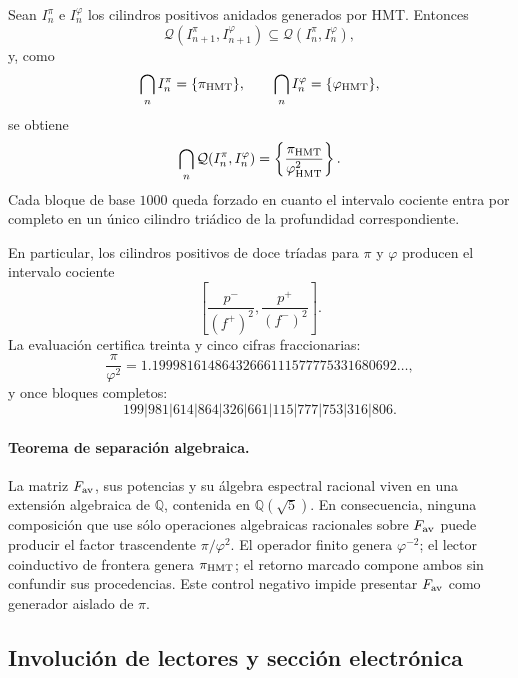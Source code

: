 Sean \(I_n^\pi\) e \(I_n^\varphi\) los cilindros positivos anidados
generados por HMT\@. Entonces
\[
 \mathcal Q(I_{n+1}^\pi,I_{n+1}^\varphi)
 \subseteq
 \mathcal Q(I_n^\pi,I_n^\varphi),
\]
y, como
\[
 \bigcap_n I_n^\pi=\{\pi_{\rm HMT}\},
 \qquad
 \bigcap_n I_n^\varphi=\{\varphi_{\rm HMT}\},
\]
se obtiene
\[
 \bigcap_n\mathcal Q(I_n^\pi,I_n^\varphi)
 =\left\{\frac{\pi_{\rm HMT}}{\varphi_{\rm HMT}^2}\right\}.
\]
Cada bloque de base \(1000\) queda forzado en cuanto el intervalo cociente
entra por completo en un único cilindro triádico de la profundidad
correspondiente.

En particular, los cilindros positivos de doce tríadas para \(\pi\) y
\(\varphi\) producen el intervalo cociente
\[
 \left[
 \frac{p^-}{(f^+)^2},
 \frac{p^+}{(f^-)^2}
 \right].
\]
La evaluación certifica treinta y cinco cifras fraccionarias:
\[
 \frac{\pi}{\varphi^2}
 =1.19998161486432666111577775331680692\ldots,
\]
y once bloques completos:
\[
 199|981|614|864|326|661|115|777|753|316|806.
\]

\paragraph{Teorema de separación algebraica.}
La matriz \(F_{\rm av}\), sus potencias y su álgebra espectral racional
viven en una extensión algebraica de \(\mathbb Q\), contenida en
\(\mathbb Q(\sqrt5)\). En consecuencia, ninguna composición que use sólo
operaciones algebraicas racionales sobre \(F_{\rm av}\) puede producir el
factor trascendente \(\pi/\varphi^2\). El operador finito genera
\(\varphi^{-2}\); el lector coinductivo de frontera genera
\(\pi_{\rm HMT}\); el retorno marcado compone ambos sin confundir sus
procedencias. Este control negativo impide presentar \(F_{\rm av}\) como
generador aislado de \(\pi\).

\subsection{Involución de lectores y sección electrónica}
\label{p12-83-c16-s3:sec:espejo-pi-phi-electron}

